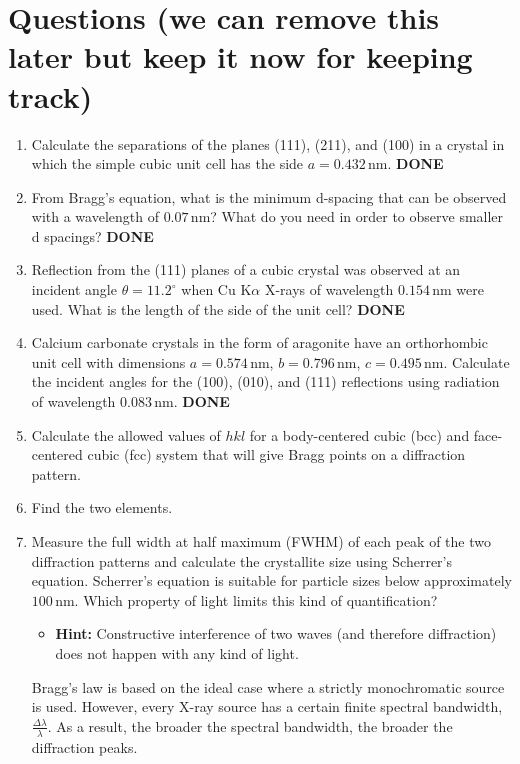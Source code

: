 \section*{Questions (we can remove this later but keep it now for keeping track)}

\begin{enumerate}
    \item Calculate the separations of the planes (111), (211), and (100) in a crystal in which the simple cubic unit cell has the side \( a = 0.432 \, \text{nm} \). \textbf{DONE}
    \item From Bragg’s equation, what is the minimum d-spacing that can be observed with a wavelength of \( 0.07 \, \text{nm} \)? What do you need in order to observe smaller d spacings? \textbf{DONE}
    \item Reflection from the (111) planes of a cubic crystal was observed at an incident angle \( \theta = 11.2^\circ \) when Cu K\(\alpha\) X-rays of wavelength \( 0.154 \, \text{nm} \) were used. What is the length of the side of the unit cell? \textbf{DONE}
    \item Calcium carbonate crystals in the form of aragonite have an orthorhombic unit cell with dimensions \( a = 0.574 \, \text{nm} \), \( b = 0.796 \, \text{nm} \), \( c = 0.495 \, \text{nm} \). Calculate the incident angles for the (100), (010), and (111) reflections using radiation of wavelength \( 0.083 \, \text{nm} \). \textbf{DONE}
    \item Calculate the allowed values of \( hkl \) for a body-centered cubic (bcc) and face-centered cubic (fcc) system that will give Bragg points on a diffraction pattern.
    \item Find the two elements.
    \item Measure the full width at half maximum (FWHM) of each peak of the two diffraction patterns and calculate the crystallite size using Scherrer’s equation. Scherrer’s equation is suitable for particle sizes below approximately \( 100 \, \text{nm} \). Which property of light limits this kind of quantification? 
    \begin{itemize}
        \item \textbf{Hint:} Constructive interference of two waves (and therefore diffraction) does not happen with any kind of light.
    \end{itemize}
    Bragg’s law is based on the ideal case where a strictly monochromatic source is used. However, every X-ray source has a certain finite spectral bandwidth, \( \frac{\Delta \lambda}{\lambda} \). As a result, the broader the spectral bandwidth, the broader the diffraction peaks.
    

\end{enumerate}
